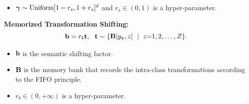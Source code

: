 \documentclass[landscape,a0paper,fontscale=0.292]{baposter}
\newcommand{\tmb}{Memorized Transformation Shifting\xspace}
\begin{document}
\begin{poster}
{\begin{minipage}[t]{0.48\linewidth}
\begin{itemize}
        \item ${\bm \gamma} \sim \operatorname{Uniform}[1 - r_s, 1 + r_s]^d$ and $r_s \in (0, 1)$ is a hyper-parameter.
    \end{itemize}
  \end{minipage}
  \hfill
  \begin{minipage}[t]{0.48\linewidth}
    \textbf{\color{blue}\tmb:}
    \vspace{-0.5em}
    \begin{equation}
        \label{eqn:shifting}
        {\bf b} = r_b {\bf t}, ~~ {\bf t} \sim \{{\bf B}[y_{{\bf v}}, z]~\mid~z \small{=} {1, 2, \dots, Z}\}.
    \end{equation}
    \begin{itemize}
        \vspace{-0.5em}
        \item ${\bf b}$ is the semantic shifting factor.
        \item ${\bf B}$ is the memory bank that records the intra-class transformations according to the FIFO principle.
        \item $r_b \in (0, +\infty)$ is a hyper-parameter.
    \end{itemize}
  \end{minipage}

}


\end{poster}
\end{document}

